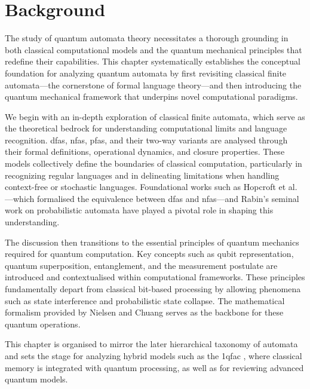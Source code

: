\chapter{Background}  
\label{chap:background}

The study of quantum automata theory necessitates a thorough grounding in both classical computational models and the quantum mechanical principles that redefine their capabilities. This chapter systematically establishes the conceptual foundation for analyzing quantum automata by first revisiting classical finite automata—the cornerstone of formal language theory—and then introducing the quantum mechanical framework that underpins novel computational paradigms.

We begin with an in-depth exploration of classical finite automata, which serve as the theoretical bedrock for understanding computational limits and language recognition. \glspl{dfa}, \glspl{nfa}, \glspl{pfa}, and their two-way variants are analysed through their formal definitions, operational dynamics, and closure properties. These models collectively define the boundaries of classical computation, particularly in recognizing regular languages and in delineating limitations when handling context-free or stochastic languages. Foundational works such as Hopcroft et al. \cite{hopcroft2006introduction}—which formalised the equivalence between \glspl{dfa} and \glspl{nfa}—and Rabin's seminal work on probabilistic automata \cite{rabin1963probabilistic} have played a pivotal role in shaping this understanding.

The discussion then transitions to the essential principles of quantum mechanics required for quantum computation. Key concepts such as qubit representation, quantum superposition, entanglement, and the measurement postulate are introduced and contextualised within computational frameworks. These principles fundamentally depart from classical bit-based processing by allowing phenomena such as state interference and probabilistic state collapse. The mathematical formalism provided by Nielsen and Chuang \cite{nielsen2010quantum} serves as the backbone for these quantum operations.

This chapter is organised to mirror the later hierarchical taxonomy of automata and sets the stage for analyzing hybrid models such as the \gls{1qfac} \cite{zheng2012one}, where classical memory is integrated with quantum processing, as well as for reviewing advanced quantum models.



